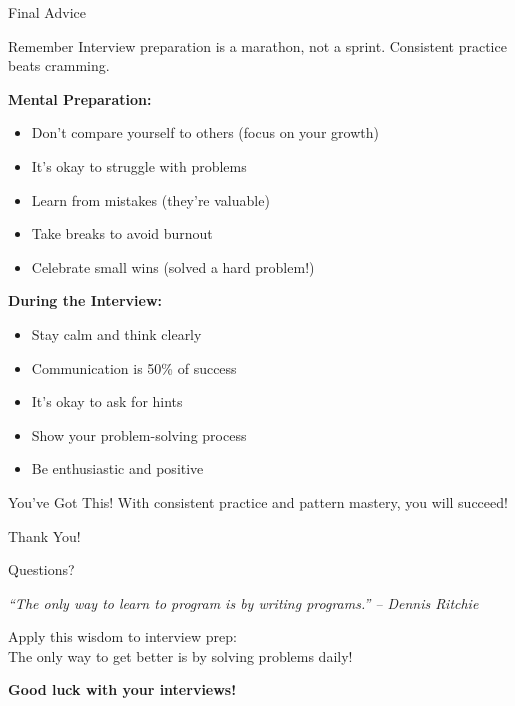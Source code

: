 \documentclass[aspectratio=169,xcolor=dvipsnames]{beamer}
\begin{document}
\begin{frame}{Final Advice}
  \begin{block}{Remember}
    Interview preparation is a marathon, not a sprint. Consistent practice beats cramming.
  \end{block}

  \vspace{0.3cm}
  \textbf{Mental Preparation:}
  \begin{itemize}
    \item Don't compare yourself to others (focus on your growth)
    \item It's okay to struggle with problems
    \item Learn from mistakes (they're valuable)
    \item Take breaks to avoid burnout
    \item Celebrate small wins (solved a hard problem!)
  \end{itemize}

  \vspace{0.3cm}
  \textbf{During the Interview:}
  \begin{itemize}
    \item Stay calm and think clearly
    \item Communication is 50\% of success
    \item It's okay to ask for hints
    \item Show your problem-solving process
    \item Be enthusiastic and positive
  \end{itemize}

  \vspace{0.3cm}
  \begin{alertblock}{You've Got This!}
    With consistent practice and pattern mastery, you will succeed!
  \end{alertblock}
\end{frame}

\begin{frame}
  \begin{center}
    {\Huge Thank You!}

    \vspace{1cm}
    {\Large Questions?}

    \vspace{1cm}
    \textit{``The only way to learn to program is by writing programs.'' -- Dennis Ritchie}

    \vspace{0.5cm}
    \small Apply this wisdom to interview prep: \\
    The only way to get better is by solving problems daily!

    \vspace{1cm}
    \textbf{Good luck with your interviews!}
  \end{center}
\end{frame}
\end{document}
